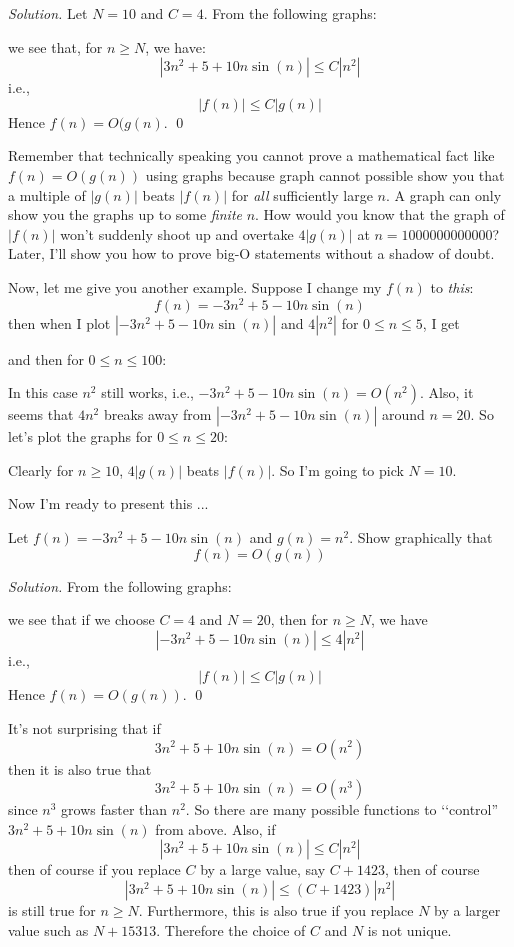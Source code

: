 \textit{Solution.}
Let $N = 10$ and $C = 4$.
From the following graphs:


we see that, for $n \geq N$, we have:
\[
|3n^2 + 5 + 10n \sin(n)| \leq C |n^2|
\]
i.e.,
\[
|f(n)| \leq C|g(n)|
\]
Hence $f(n) = O(g(n)$.
\qed

Remember that technically speaking you cannot prove a mathematical
fact like $f(n) = O(g(n))$ using graphs
because graph cannot possible show you that a multiple of $|g(n)|$
beats $|f(n)|$ for \textit{all} sufficiently large $n$.
A graph can only show you the graphs up to some \textit{finite} $n$.
How would you know that the graph 
of $|f(n)|$ won't suddenly shoot up and overtake $4|g(n)|$ at 
$n = 1000000000000$?
Later, I'll show you how to prove big-O statements without a shadow of doubt.

Now, let me give you another example.
Suppose I change my $f(n)$ to \textit{this}:
\[
f(n) = -3n^2 + 5 - 10 n \sin (n)
\]
then when I plot
$|-3n^2 + 5 - 10 n \sin (n)|$ 
and $4|n^2|$ for $0 \leq n \leq 5$,
I get

and then for $0 \leq n \leq 100$:

In this case $n^2$ still works, i.e., 
$-3n^2 + 5 - 10 n \sin (n) = O(n^2)$.
Also, it seems that $4n^2$ breaks away from 
$|-3n^2+5-10n \sin(n)|$ around $n = 20$.
So let's plot the graphs for $0 \leq n \leq 20$:

Clearly for $n \geq 10$, $4|g(n)|$ beats $|f(n)|$.
So I'm going to pick $N = 10$.

Now I'm ready to present this ...

\newpage

\begin{eg}
Let $f(n) = -3n^2+5-10n \sin(n)$ and $g(n) = n^2$.
Show graphically that 
\[
f(n) = O(g(n))
\]
\end{eg}

\textit{Solution.}
From the following graphs:


we see that if we choose $C = 4$ and $N  = 20$, then for $n \geq N$,
we have
\[
|-3n^2+5-10n \sin(n)| \leq 4|n^2|
\]
i.e.,
\[
|f(n)| \leq C|g(n)|
\]
Hence $f(n) = O(g(n))$.
\qed

\newpage

It's not surprising that if 
\[
3n^2 + 5 + 10 n \sin (n) = O(n^2)
\]
then it is also true that 
\[
3n^2 + 5 + 10 n \sin (n) = O(n^3)
\]
since $n^3$ grows faster than $n^2$.
So there are many possible functions to \lq\lq control''
$3n^2 + 5 + 10n \sin(n)$ from above.
Also, if
\[
|3n^2 + 5 + 10 n \sin (n)| \leq C|n^2|
\]
then of course if you replace $C$ by a large value, say $C + 1423$,
then of course
\[
|3n^2 + 5 + 10 n \sin (n)| \leq (C + 1423)|n^2|
\]
is still true for $n \geq N$.
Furthermore, this is also true if you replace $N$ by a larger value
such as $N + 15313$.
Therefore the choice of $C$ and $N$ is not unique.


